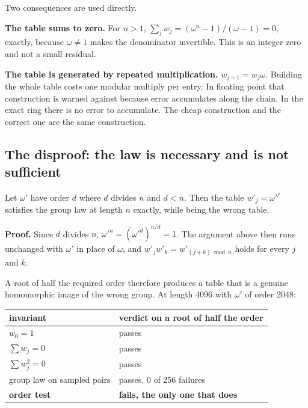 Two consequences are used directly.

\textbf{The table sums to zero.} For \(n > 1\), \(\sum_j w_j = (\omega^n - 1)/(\omega - 1) = 0\), exactly, because \(\omega \ne 1\) makes the denominator invertible. This is an integer zero and not a small residual.

\textbf{The table is generated by repeated multiplication.} \(w_{j+1} = w_j \omega\). Building the whole table costs one modular multiply per entry. In floating point that construction is warned against because error accumulates along the chain. In the exact ring there is no error to accumulate. The cheap construction and the correct one are the same construction.

\subsection{The disproof: the law is necessary and is not sufficient}

\begin{proposition}
Let \(\omega'\) have order \(d\) where \(d\) divides \(n\) and \(d < n\). Then the table \(w'_j = \omega'^j\) satisfies the group law at length \(n\) exactly, while being the wrong table.
\end{proposition}

\textbf{Proof.} Since \(d\) divides \(n\), \(\omega'^n = (\omega'^d)^{n/d} = 1\). The argument above then runs unchanged with \(\omega'\) in place of \(\omega\), and \(w'_j w'_k = w'_{(j+k) \bmod n}\) holds for every \(j\) and \(k\). \qedsymbol

A root of half the required order therefore produces a table that is a genuine homomorphic image of the wrong group. At length 4096 with \(\omega'\) of order 2048:

\begin{center}
\begin{tabular}{@{}ll@{}}
\toprule
invariant & verdict on a root of half the order \\
\midrule
\(w_0 = 1\) & passes \\
\(\sum w_j = 0\) & passes \\
\(\sum w_j^2 = 0\) & passes \\
group law on sampled pairs & passes, 0 of 256 failures \\
\textbf{order test} & \textbf{fails, the only one that does} \\
\bottomrule
\end{tabular}
\end{center}


